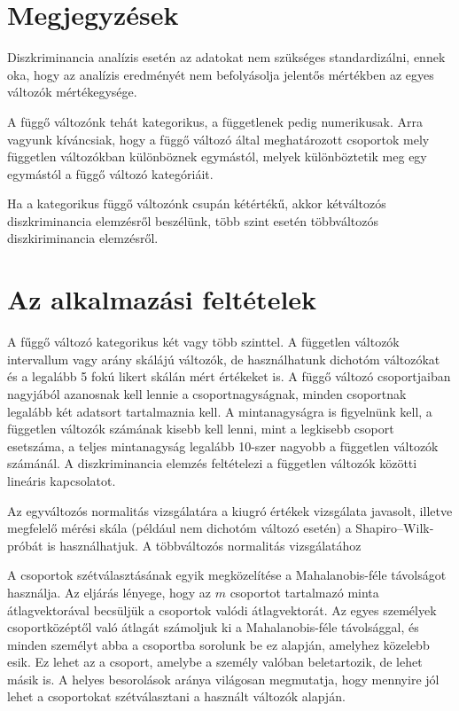 \documentclass[
  letterpaper,
]{krantz}
\begin{document}
\hypertarget{megjegyzuxe9sek}{%
\section{Megjegyzések}\label{megjegyzuxe9sek}}

Diszkriminancia analízis esetén az adatokat nem szükséges
standardizálni, ennek oka, hogy az analízis eredményét nem befolyásolja
jelentős mértékben az egyes változók mértékegysége.

A függő változónk tehát kategorikus, a függetlenek pedig numerikusak.
Arra vagyunk kíváncsiak, hogy a függő változó által meghatározott
csoportok mely független változókban különböznek egymástól, melyek
különböztetik meg egy egymástól a függő változó kategóriáit.

Ha a kategorikus függő változónk csupán kétértékű, akkor kétváltozós
diszkriminancia elemzésről beszélünk, több szint esetén többváltozós
diszkiriminancia elemzésről.

\hypertarget{az-alkalmazuxe1si-feltuxe9telek}{%
\section{Az alkalmazási
feltételek}\label{az-alkalmazuxe1si-feltuxe9telek}}

A fűggő változó kategorikus két vagy több szinttel. A független változók
intervallum vagy arány skálájú változók, de használhatunk dichotóm
változókat és a legalább 5 fokú likert skálán mért értékeket is. A függő
változó csoportjaiban nagyjából azanosnak kell lennie a
csoportnagyságnak, minden csoportnak legalább két adatsort tartalmaznia
kell. A mintanagyságra is figyelnünk kell, a független változók számának
kisebb kell lenni, mint a legkisebb csoport esetszáma, a teljes
mintanagyság legalább 10-szer nagyobb a független változók számánál. A
diszkriminancia elemzés feltételezi a független változók közötti
lineáris kapcsolatot.

Az egyváltozós normalitás vizsgálatára a kiugró értékek vizsgálata
javasolt, illetve megfelelő mérési skála (például nem dichotóm változó
esetén) a Shapiro--Wilk-próbát is használhatjuk. A többváltozós
normalitás vizsgálatához

A csoportok szétválasztásának egyik megközelítése a Mahalanobis-féle
távolságot használja. Az eljárás lényege, hogy az \(m\) csoportot
tartalmazó minta átlagvektorával becsüljük a csoportok valódi
átlagvektorát. Az egyes személyek csoportközéptől való átlagát számoljuk
ki a Mahalanobis-féle távolsággal, és minden személyt abba a csoportba
sorolunk be ez alapján, amelyhez közelebb esik. Ez lehet az a csoport,
amelybe a személy valóban beletartozik, de lehet másik is. A helyes
besorolások aránya világosan megmutatja, hogy mennyire jól lehet a
csoportokat szétválasztani a használt változók alapján.
\end{document}

